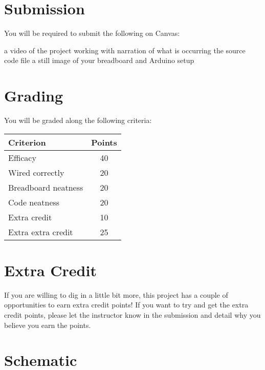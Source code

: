 \section*{Submission}
You will be required to submit the following on Canvas:
\begin{outline}
    \1 a video of the project working with narration of what is occurring
    \1 the source code file
    \1 a still image of your breadboard and Arduino setup
\end{outline}

\section*{Grading}
You will be graded along the following criteria:

\begin{table*}[h!]
    \begin{tabular}{ l | c }
        \toprule
        Criterion & Points \\

        \midrule
        Efficacy & 40 \\
        Wired correctly & 20 \\
        Breadboard neatness & 20 \\
        Code neatness & 20 \\
        Extra credit & 10 \\
        Extra extra credit \footnotemark & 25 \\

        \bottomrule
    \end{tabular}
\end{table*}

\section*{Extra Credit}
If you are willing to dig in a little bit more, this project has a couple of opportunities to earn extra credit points!
If you want to try and get the extra credit points, please let the instructor know in the submission and detail why you believe you earn the points.

\section*{Schematic}

\begin{lstlisting}[linewidth=1.5\textwidth]

\end{lstlisting}